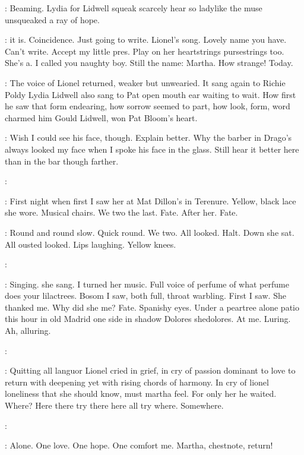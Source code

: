 :
Beaming. Lydia for Lidwell squeak scarcely hear so ladylike the muse unsqueaked a ray of hope.

\BloomInt:
 it is. Coincidence. Just going to write.
Lionel's song. Lovely
name you have. Can't write. Accept my little pres. Play on her
heartstrings pursestrings too. She's a. I called you naughty boy. Still
the name: Martha. How strange! Today.

:
The voice of Lionel returned, weaker but unwearied. It sang again to
Richie Poldy Lydia Lidwell also sang to Pat open mouth ear waiting to
wait. How first he saw that form endearing, how sorrow seemed to part,
how look, form, word charmed him
Gould Lidwell, won Pat Bloom's heart.

\BloomInt:
Wish I could see his face, though. Explain better. Why the barber in
Drago's always looked my face when I spoke his face in the glass. Still
hear it better here than in the bar though farther.

\simon:

\BloomInt:
First night when first I saw her at Mat Dillon's in Terenure. Yellow,
black lace she wore. Musical chairs. We two the last. Fate. After her.
Fate.

\BloomInt:
Round and round slow. Quick round. We two. All looked. Halt. Down she
sat. All ousted looked. Lips laughing. Yellow knees.

\simon:

\BloomInt:
Singing.
 she sang.
I turned her music. Full voice of perfume
of what perfume does your lilactrees. Bosom I saw, both full, throat
warbling. First I saw. She thanked me. Why did she me? Fate. Spanishy
eyes. Under a peartree alone patio this hour in old Madrid one side in
shadow Dolores shedolores. At me. Luring. Ah, alluring.

\simon:

\BloomInt:
Quitting all languor Lionel cried in grief, in cry of passion dominant
to love to return with deepening yet with rising chords of harmony. In cry
of lionel loneliness that she should know, must martha feel. For only her
he waited. Where? Here there try there here all try where. Somewhere.

\simon:

\BloomInt:
Alone. One love. One hope. One comfort me.
Martha, chestnote, return!

